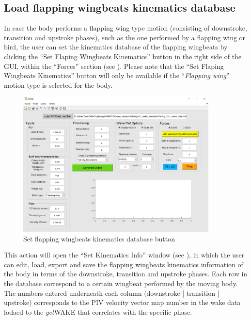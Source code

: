 \documentclass[12pt,a4paper]{article}
\begin{document}
\newpage
\subsection{Load flapping wingbeats kinematics database}\label{KIN-DB}

In case the body performs a flapping wing type motion (consisting of downstroke, transition and upstroke phases), such as the one performed by a flapping wing or bird, the user can set the kinematics database of the flapping wingbeats by clicking the ``Set Flaping Wingbeats Kinematics'' button in the right side of the GUI, within the ``Forces'' section (see ). Please note that the ``Set Flaping Wingbeats Kinematics'' button will only be available if the ``\textit{Flapping wing}'' motion type is selected for the body.

\begin{figure}[ht!]
	\centering
	\includegraphics[width=0.9\textwidth]{set-kinematics-database}
	\caption{Set flapping wingbeats kinematics database button}
	\label{fig:GUI-set-kinematics-database}
\end{figure}


This action will open the ``Set Kinematics Info'' window (see ), in which the user can edit, load, export and save the flapping wingbeats kinematics information of the body in terms of the downstroke, transition and upstroke phases.
Each row in the database correspond to a certain wingbeat performed by the moving body. 
The numbers entered underneath each column (downstroke | transition | upstroke) corresponds to the PIV velocity vector map number in the wake data lodaed to the \textit{get}WAKE that correlates with the specific phase.
\end{document}

